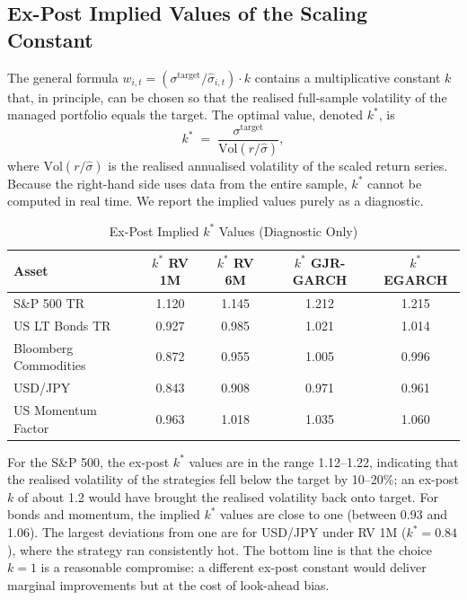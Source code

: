 \documentclass[12pt, a4paper]{article}
\newcommand{\stgt}{\sigma^{\mathrm{target}}}
\newcommand{\shat}{\hat{\sigma}}
\begin{document}
\subsection{Ex-Post Implied Values of the Scaling Constant}
\label{sec:diag_k}

The general formula $w_{i,t} = (\stgt/\shat_{i,t})\cdot k$ contains a multiplicative
constant $k$ that, in principle, can be chosen so that the realised full-sample volatility
of the managed portfolio equals the target. The optimal value, denoted $k^*$, is
\begin{equation}
  k^* \;=\; \frac{\stgt}{\mathrm{Vol}\!\left( r/\shat \right)},
\end{equation}
where $\mathrm{Vol}(r/\shat)$ is the realised annualised volatility of the scaled return
series. Because the right-hand side uses data from the entire sample, $k^*$ cannot be
computed in real time. We report the implied values purely as a diagnostic.

\begin{table}[H]
  \centering
  \caption{Ex-Post Implied $k^*$ Values (Diagnostic Only)}
  \label{tab:k_star}
  \small
  \begin{tabular}{lcccc}
    \toprule
    \textbf{Asset} & \textbf{$k^*$ RV 1M} & \textbf{$k^*$ RV 6M}
                   & \textbf{$k^*$ GJR-GARCH} & \textbf{$k^*$ EGARCH} \\
    \midrule
    S\&P 500 TR              & 1.120 & 1.145 & 1.212 & 1.215 \\
    US LT Bonds TR           & 0.927 & 0.985 & 1.021 & 1.014 \\
    Bloomberg Commodities    & 0.872 & 0.955 & 1.005 & 0.996 \\
    USD/JPY                  & 0.843 & 0.908 & 0.971 & 0.961 \\
    US Momentum Factor       & 0.963 & 1.018 & 1.035 & 1.060 \\
    \bottomrule
  \end{tabular}
\end{table}

\noindent
For the S\&P 500, the ex-post $k^*$ values are in the range 1.12--1.22, indicating that
the realised volatility of the strategies fell below the target by 10--20\%; an ex-post
$k$ of about 1.2 would have brought the realised volatility back onto target. For bonds
and momentum, the implied $k^*$ values are close to one (between 0.93 and 1.06). The
largest deviations from one are for USD/JPY under RV 1M ($k^* = 0.84$), where the
strategy ran consistently hot. The bottom line is that the choice $k = 1$ is a reasonable
compromise: a different ex-post constant would deliver marginal improvements but at the
cost of look-ahead bias.
\end{document}

